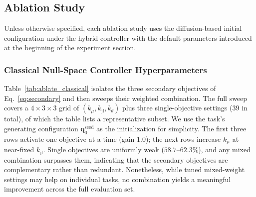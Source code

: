 \documentclass{svproc}
\begin{document}
\subsection{Ablation Study}

Unless otherwise specified, each ablation study uses the diffusion-based initial configuration under the hybrid controller with the default parameters introduced at the beginning of the experiment section.

\subsubsection{Classical Null-Space Controller Hyperparameters}

Table~\ref{tab:ablate_classical} isolates the three secondary objectives of Eq.~\eqref{eq:secondary} and then sweeps their weighted combination.  The full sweep covers a $4\times3\times3$ grid of $(k_{\mu},k_{\mathrm{jl}},k_{\theta})$ plus three single-objective settings ($39$ in total), of which the table lists a representative subset. We use the task's generating configuration $\mathbf{q}_{0}^{\mathrm{seed}}$ as the initialization for simplicity. The first three rows activate one objective at a time (gain $1.0$); the next rows increase $k_{\mu}$ at near-fixed $k_{\mathrm{jl}}$. Single objectives are uniformly weak ($58.7$--$62.3\%$), and any mixed combination surpasses them, indicating that the secondary objectives are complementary rather than redundant. Nonetheless, while tuned mixed-weight settings may help on individual tasks, no combination yields a meaningful improvement across the full evaluation set.
\end{document}
